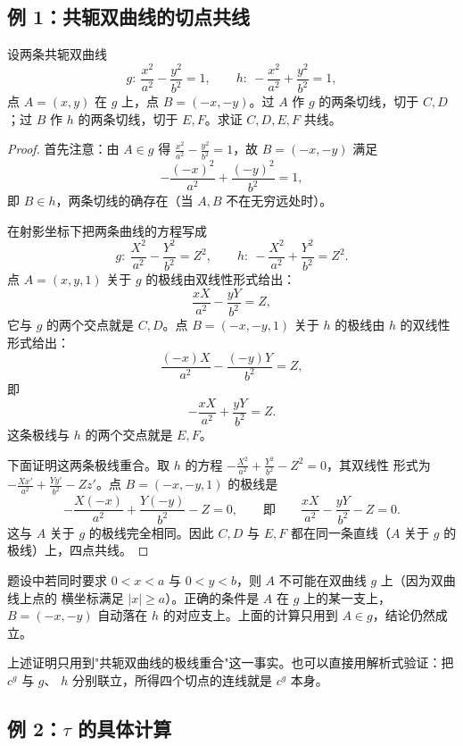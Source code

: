 \subsection{例 1：共轭双曲线的切点共线}

\begin{example}
\label{ex:conj-tangents}
设两条共轭双曲线
\[
g:\ \frac{x^2}{a^2}-\frac{y^2}{b^2}=1,\qquad h:\ -\frac{x^2}{a^2}+\frac{y^2}{b^2}=1 ,
\]
点 $A=(x,y)$ 在 $g$ 上，点 $B=(-x,-y)$。过 $A$ 作 $g$ 的两条切线，切于 $C,D$；过 $B$ 作
$h$ 的两条切线，切于 $E,F$。求证 $C,D,E,F$ 共线。
\end{example}

\begin{proof}
首先注意：由 $A\in g$ 得 $\frac{x^2}{a^2}-\frac{y^2}{b^2}=1$，故 $B=(-x,-y)$ 满足
\[
-\frac{(-x)^2}{a^2}+\frac{(-y)^2}{b^2}=1,
\]
即 $B\in h$，两条切线的确存在（当 $A,B$ 不在无穷远处时）。

在射影坐标下把两条曲线的方程写成
\[
g:\ \frac{X^2}{a^2}-\frac{Y^2}{b^2}=Z^2,\qquad
h:\ -\frac{X^2}{a^2}+\frac{Y^2}{b^2}=Z^2 .
\]
点 $A=(x,y,1)$ 关于 $g$ 的极线由双线性形式给出：
\[
\frac{xX}{a^2}-\frac{yY}{b^2}=Z,
\]
它与 $g$ 的两个交点就是 $C,D$。点 $B=(-x,-y,1)$ 关于 $h$ 的极线由 $h$ 的双线性形式给出：
\[
\frac{(-x)X}{a^2}-\frac{(-y)Y}{b^2}=Z,
\]
即
\[
-\frac{xX}{a^2}+\frac{yY}{b^2}=Z .
\]
这条极线与 $h$ 的两个交点就是 $E,F$。

下面证明这两条极线重合。取 $h$ 的方程 $-\frac{X^2}{a^2}+\frac{Y^2}{b^2}-Z^2=0$，其双线性
形式为 $-\frac{Xx'}{a^2}+\frac{Yy'}{b^2}-Zz'$。点 $B=(-x,-y,1)$ 的极线是
\[
-\frac{X(-x)}{a^2}+\frac{Y(-y)}{b^2}-Z=0,
\qquad\text{即}\qquad
\frac{xX}{a^2}-\frac{yY}{b^2}-Z=0 .
\]
这与 $A$ 关于 $g$ 的极线完全相同。因此 $C,D$ 与 $E,F$ 都在同一条直线（$A$ 关于 $g$ 的
极线）上，四点共线。
\end{proof}

\begin{remark}
题设中若同时要求 $0<x<a$ 与 $0<y<b$，则 $A$ 不可能在双曲线 $g$ 上（因为双曲线上点的
横坐标满足 $|x|\ge a$）。正确的条件是 $A$ 在 $g$ 上的某一支上，$B=(-x,-y)$ 自动落在 $h$
的对应支上。上面的计算只用到 $A\in g$，结论仍然成立。
\end{remark}

\begin{remark}
上述证明只用到"共轭双曲线的极线重合"这一事实。也可以直接用解析式验证：把 $c^g$ 与 $g$、
$h$ 分别联立，所得四个切点的连线就是 $c^g$ 本身。
\end{remark}

\subsection{例 2：$\tau$ 的具体计算}

